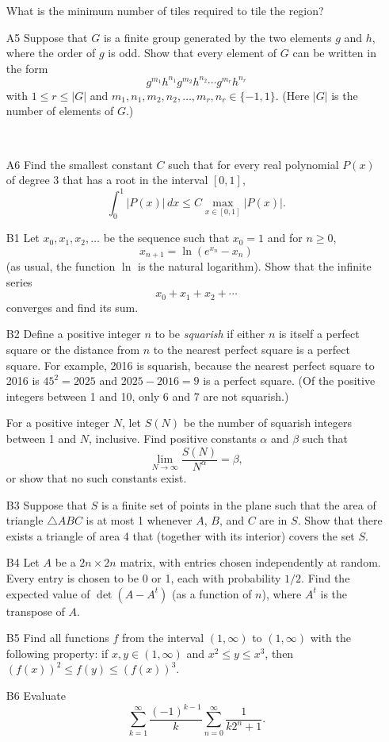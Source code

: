 \documentclass[amssymb,twocolumn,pra,10pt,aps]{revtex4-1}
\begin{document}
\begin{itemize}
What is the minimum number of tiles required to tile the region?

\item[A5]
Suppose that $G$ is a finite group generated by the two elements $g$ and $h$, where the order of $g$ is odd. Show that every element of $G$ can be written in the form
\[
g^{m_1} h^{n_1} g^{m_2} h^{n_2} \cdots g^{m_r} h^{n_r}
\]
with $1 \leq r \leq |G|$ and $m_1, n_1, m_2, n_2, \ldots, m_r, n_r \in \{-1, 1\}$. 
(Here $|G|$ is the number of elements of $G$.)

\,
\item[A6]
Find the smallest constant $C$ such that for every real polynomial $P(x)$ of degree 3 that has a root in the interval $[0,1]$,
\[
\int_0^1 \left| P(x) \right|\,dx \leq C \max_{x \in [0,1]} \left| P(x) \right|.
\]

\item[B1]
Let $x_0,x_1,x_2,\dots$ be the sequence such that $x_0=1$ and for $n \geq 0$,
\[
x_{n+1} = \ln(e^{x_n} - x_n)
\]
(as usual, the function $\ln$ is the natural logarithm). Show that the infinite series
\[
x_0 + x_1 + x_2 + \cdots
\]
converges and find its sum.

\item[B2]
Define a positive integer $n$ to be \emph{squarish} if either $n$ is itself a perfect square or the distance from $n$ to the nearest perfect square is a perfect square. For example, 2016 is squarish, because the nearest perfect square to 2016 is $45^2 = 2025$ and $2025-2016=9$ is a perfect square. (Of the positive integers between 1 and 10, only 6 and 7 are not squarish.)

For a positive integer $N$, let $S(N)$ be the number of squarish integers between 1 and $N$,
inclusive. Find positive constants $\alpha$ and $\beta$ such that
\[
\lim_{N \to \infty} \frac{S(N)}{N^\alpha} = \beta,
\]
or show that no such constants exist.

\item[B3]
Suppose that $S$ is a finite set of points in the plane such that the area of triangle
$\triangle ABC$ is at most 1 whenever $A$, $B$, and $C$ are in $S$. Show that there exists a triangle of area 4 that (together with its interior) covers the set $S$.

\item[B4]
Let $A$ be a $2n \times 2n$ matrix, with entries chosen independently at random. Every entry is chosen to be 0 or 1, each with probability $1/2$. Find the expected value of $\det(A-A^t)$ (as a function of $n$), where $A^t$ is the transpose of $A$.

\item[B5]
Find all functions $f$ from the interval $(1, \infty)$ to $(1, \infty)$ with the following property:
if $x,y \in (1, \infty)$ and $x^2 \leq y \leq x^3$, then $(f(x))^2 \leq f(y) \leq (f(x))^3$.

\item[B6]
Evaluate
\[
\sum_{k=1}^\infty \frac{(-1)^{k-1}}{k} \sum_{n=0}^\infty \frac{1}{k2^n + 1}.
\]
\end{itemize}
\end{document}
